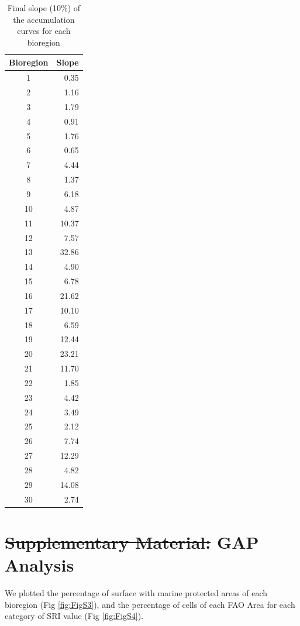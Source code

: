 \documentclass[12pt,authoryear]{elsarticle}
\providecommand{\DIFdeltex}[1]{{\protect\color{red}\sout{#1}}}                      %
\providecommand{\DIFaddbegin}{} %
\providecommand{\DIFaddend}{} %
\providecommand{\DIFdelbegin}{} %
\providecommand{\DIFdelend}{} %
\providecommand{\DIFdel}[1]{\texorpdfstring{\DIFdeltex{#1}}{}} %
\begin{document}
\begin{table}[h]
\centering
\begin{tabular}{| c | r |}
  \hline
\textbf{Bioregion} & \textbf{Slope} \\ 
  \hline
  \hline
1 & 0.35 \\ 
2 & 1.16 \\ 
3 & 1.79 \\ 
4 & 0.91 \\ 
5 & 1.76 \\ 
6 & 0.65 \\ 
7 & 4.44 \\ 
8 & 1.37 \\ 
9 & 6.18 \\ 
10 & 4.87 \\ 
11 & 10.37 \\ 
12 & 7.57 \\ 
13 & 32.86 \\ 
14 & 4.90 \\ 
15 & 6.78 \\ 
16 & 21.62 \\ 
17 & 10.10 \\ 
18 & 6.59 \\ 
19 & 12.44 \\ 
20 & 23.21 \\ 
21 & 11.70 \\ 
22 & 1.85 \\ 
23 & 4.42 \\ 
24 & 3.49 \\ 
25 & 2.12 \\ 
26 & 7.74 \\ 
27 & 12.29 \\ 
28 & 4.82 \\ 
29 & 14.08 \\ 
30 & 2.74 \\ 
  \hline
   \hline
\end{tabular}
\caption{Final slope (10$\%$) of the accumulation curves for each bioregion}
\label{tab:slope}
\end{table}

\section{\DIFdelbegin \DIFdel{Supplementary Material: }\DIFdelend GAP Analysis}
\DIFaddbegin \label{sec:gap-analysis-1}
\DIFaddend We plotted the percentage of surface with marine protected areas of each bioregion (Fig \ref{fig:FigS3}), and the percentage of cells of each FAO Area for each category of SRI value (Fig \ref{fig:FigS4}).
\end{document}
